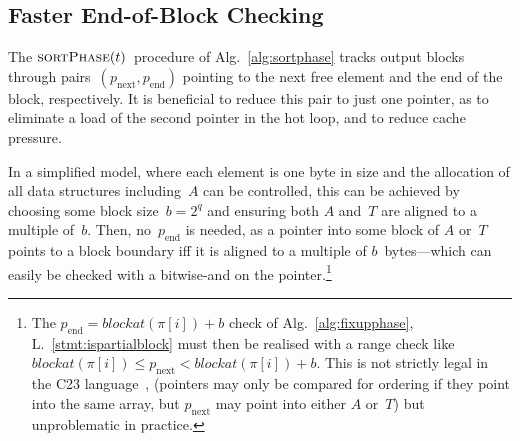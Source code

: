 \documentclass[nolineno,a4paper,UKenglish,cleveref, autoref, thm-restate]{socg-lipics-v2021}
\def\blockat{\textit{blockat}}
\begin{document}
\subsection{Faster End-of-Block Checking} \label{sec:fasteob}
The $\Call{sortPhase}{t}$~procedure of Alg.~\ref{alg:sortphase} tracks
output blocks through pairs~$(p_{\mathrm{next}},p_{\mathrm{end}})$
pointing to the next free element and the end of the block, respectively.
It is beneficial to reduce this pair to just
one pointer, as to eliminate a load of the second pointer
in the hot loop, and to reduce cache pressure.

In a simplified model, where each element is one byte
in size and the allocation of all data structures including~$A$ can be
controlled, this can be achieved by choosing some block size~$b=2^q$
and ensuring both $A$ and~$T$ are aligned to a multiple of~$b$.
Then, no~$p_{\mathrm{end}}$ is needed, as a pointer into some block
of $A$ or~$T$ points to a block boundary iff it is aligned to a
multiple of $b$~bytes---which can easily be checked with a
bitwise-and on the pointer.\footnote{The $p_{\mathrm{end}}=\blockat(\pi[i])+b$
check of Alg.~\ref{alg:fixupphase}, L.~\ref{stmt:ispartialblock} must then be
realised with a range check like $\blockat(\pi[i])\le p_{\mathrm{next}}<\blockat(\pi[i])+b$.
This is not strictly legal in the C23 language~\cite[\S~6.5.8 \P~6]{c23},
(pointers may only be compared for ordering if they point into the same array,
but $p_{\mathrm{next}}$ may point into either $A$ or~$T$)
but unproblematic in practice.}
\end{document}
